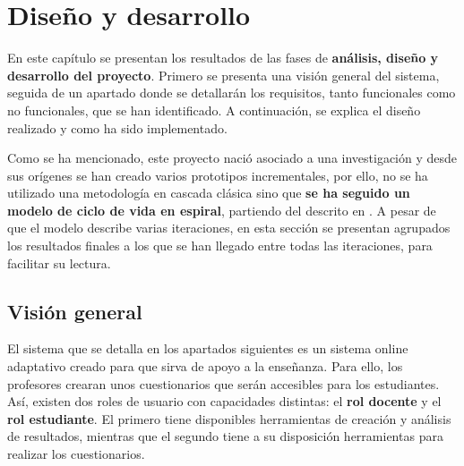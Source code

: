 \chapter{Diseño y desarrollo\label{sec:disenhoYDesarrollo}}


%

En este capítulo se presentan los resultados de las fases de \textbf{análisis, diseño y desarrollo del proyecto}. Primero se presenta una visión general del sistema, seguida de un apartado donde se detallarán los requisitos, tanto funcionales como no funcionales, que se han identificado. A continuación, se explica el diseño realizado y como ha sido implementado.

Como se ha mencionado, este proyecto nació asociado a una investigación y desde sus orígenes se han creado varios prototipos incrementales, por ello, no se ha utilizado una metodología en cascada clásica sino que \textbf{se ha seguido un modelo de ciclo de vida en espiral}, partiendo del descrito en \cite{Boehm86}. A pesar de que el modelo describe varias iteraciones, en esta sección se presentan agrupados los resultados finales a los que se han llegado entre todas las iteraciones, para facilitar su lectura.


\section{Visión general}

El sistema que se detalla en los apartados siguientes es un sistema online adaptativo creado para que sirva de apoyo a la enseñanza. Para ello, los profesores crearan unos cuestionarios que serán accesibles para los estudiantes. Así, existen dos roles de usuario con capacidades distintas: el \textbf{rol docente} y el \textbf{rol estudiante}. El primero tiene disponibles herramientas de creación y análisis de resultados, mientras que el segundo tiene a su disposición herramientas para realizar los cuestionarios.

